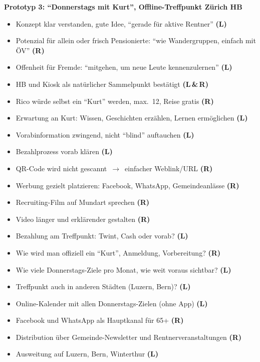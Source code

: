 \bigskip
\begin{center}\textbf{Prototyp 3: \enquote{Donnerstags mit Kurt}, Offline-Treffpunkt Zürich HB}\end{center}
\FeedbackGrid
{%
\begin{itemize}[nosep,leftmargin=1.3em]
  \item Konzept klar verstanden, gute Idee, \enquote{gerade für aktive Rentner} \textbf{(L)}
  \item Potenzial für allein oder frisch Pensionierte: \enquote{wie Wandergruppen, einfach mit ÖV} \textbf{(R)}
  \item Offenheit für Fremde: \enquote{mitgehen, um neue Leute kennenzulernen} \textbf{(L)}
  \item HB und Kiosk als natürlicher Sammelpunkt bestätigt \textbf{(L\,\&\,R)}
  \item Rico würde selbst ein \enquote{Kurt} werden, max.~12, Reise gratis \textbf{(R)}
  \item Erwartung an Kurt: Wissen, Geschichten erzählen, Lernen ermöglichen \textbf{(L)}
\end{itemize}}
{%
\begin{itemize}[nosep,leftmargin=1.3em]
  \item Vorabinformation zwingend, nicht \enquote{blind} auftauchen \textbf{(L)}
  \item Bezahlprozess vorab klären \textbf{(L)}
  \item QR-Code wird nicht gescannt~$\rightarrow$~einfacher Weblink/URL \textbf{(R)}
  \item Werbung gezielt platzieren: Facebook, WhatsApp, Gemeindeanlässe \textbf{(R)}
  \item Recruiting-Film auf Mundart sprechen \textbf{(R)}
  \item Video länger und erklärender gestalten \textbf{(R)}
\end{itemize}}
{%
\begin{itemize}[nosep,leftmargin=1.3em]
  \item Bezahlung am Treffpunkt: Twint, Cash oder vorab? \textbf{(L)}
  \item Wie wird man offiziell ein \enquote{Kurt}, Anmeldung, Vorbereitung? \textbf{(R)}
  \item Wie viele Donnerstags-Ziele pro Monat, wie weit voraus sichtbar? \textbf{(L)}
  \item Treffpunkt auch in anderen Städten (Luzern, Bern)? \textbf{(L)}
\end{itemize}}
{%
\begin{itemize}[nosep,leftmargin=1.3em]
  \item Online-Kalender mit allen Donnerstags-Zielen (ohne App) \textbf{(L)}
  \item Facebook und WhatsApp als Hauptkanal für 65+ \textbf{(R)}
  \item Distribution über Gemeinde-Newsletter und Rentnerveranstaltungen \textbf{(R)}
  \item Ausweitung auf Luzern, Bern, Winterthur \textbf{(L)}
\end{itemize}}

